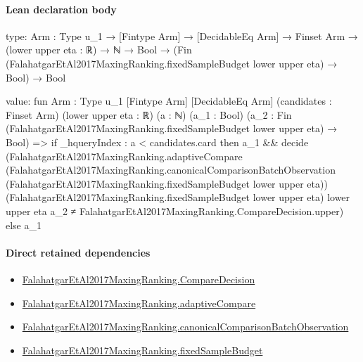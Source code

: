 \documentclass[10pt]{article}
\begin{document}
\paragraph{Lean declaration body}
\begin{ReviewVerbatim}
type:
{Arm : Type u_1} →
  [Fintype Arm] →
    [DecidableEq Arm] →
      Finset Arm →
        (lower upper eta : ℝ) →
          ℕ → Bool → (Fin (FalahatgarEtAl2017MaxingRanking.fixedSampleBudget lower upper eta) → Bool) → Bool

value:
fun {Arm : Type u_1} [Fintype Arm] [DecidableEq Arm] (candidates : Finset Arm) (lower upper eta : ℝ) (a : ℕ)
    (a_1 : Bool) (a_2 : Fin (FalahatgarEtAl2017MaxingRanking.fixedSampleBudget lower upper eta) → Bool) =>
  if _hqueryIndex : a < candidates.card then
    a_1 &&
      decide
        (FalahatgarEtAl2017MaxingRanking.adaptiveCompare
            (FalahatgarEtAl2017MaxingRanking.canonicalComparisonBatchObservation
              (FalahatgarEtAl2017MaxingRanking.fixedSampleBudget lower upper eta))
            (FalahatgarEtAl2017MaxingRanking.fixedSampleBudget lower upper eta) lower upper eta a_2 ≠
          FalahatgarEtAl2017MaxingRanking.CompareDecision.upper)
  else a_1
\end{ReviewVerbatim}

\paragraph{Direct retained dependencies}
\begin{itemize}\raggedright
\item \hyperlink{governing-declaration-3723216c72fc3dc8}{Falahatgar\allowbreak{}Et\allowbreak{}Al2017\allowbreak{}Maxing\allowbreak{}Ranking.\allowbreak{}Compare\allowbreak{}Decision}
\item \hyperlink{paper-prerequisite-8b894f32c9664991}{Falahatgar\allowbreak{}Et\allowbreak{}Al2017\allowbreak{}Maxing\allowbreak{}Ranking.\allowbreak{}adaptive\allowbreak{}Compare}
\item \hyperlink{governing-declaration-1ffc62264cfecf06}{Falahatgar\allowbreak{}Et\allowbreak{}Al2017\allowbreak{}Maxing\allowbreak{}Ranking.\allowbreak{}canonical\allowbreak{}Comparison\allowbreak{}Batch\allowbreak{}Observation}
\item \hyperlink{governing-declaration-4b4daf4bb2493573}{Falahatgar\allowbreak{}Et\allowbreak{}Al2017\allowbreak{}Maxing\allowbreak{}Ranking.\allowbreak{}fixed\allowbreak{}Sample\allowbreak{}Budget}
\end{itemize}
\hypertarget{governing-declaration-527ed94fcee862ea}{}
\end{document}
